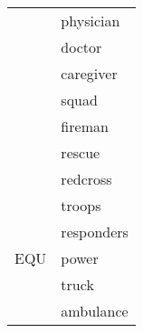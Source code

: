 \begin{center}
\begin{longtable}{rl}
                        & physician                                                                                \\
                        & doctor                                                                                   \\
                        & caregiver                                                                                \\
                        & squad                                                                                    \\
                        & fireman                                                                                  \\
                        & rescue                                                                                   \\
                        & redcross                                                                                 \\
                        & troops                                                                                   \\
                        & responders                                                                               \\
        EQU             & power                                                                                    \\
                        & truck                                                                                    \\
                        & ambulance                                                                                \\
        \bottomrule
    \end{longtable}
\end{center}
